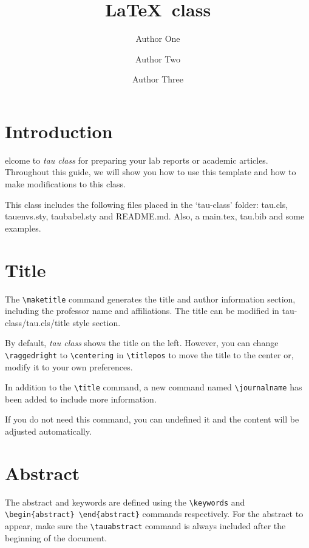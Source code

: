 \documentclass[9pt,a4paper,twoside]{tau-class/tau}
\title{\LaTeX\ class}
\author[a,1]{Author One}
\author[b,2]{Author Two}
\author[b,c,3]{Author Three}
\affil[a]{Affiliation of author one}
\affil[b]{Affiliation of author two}
\affil[c]{Affiliation of author three}
\begin{document}
		
    \maketitle 
    \thispagestyle{firststyle} \tauabstract 
    \tableofcontents
    \linenumbers 
    

\section{Introduction}

    elcome to \textit{tau class} for preparing your lab reports or academic articles. Throughout this guide, we will show you how to use this template and how to make modifications to this class. 
	
    This class includes the following files placed in the ‘tau-class’ folder: tau.cls, tauenvs.sty, taubabel.sty and README.md. Also, a main.tex, tau.bib and some examples. 

\section{Title}

    The \verb*|\maketitle| command generates the title and author information section, including the professor name and affiliations. The title can be modified in tau-class/tau.cls/title style section. 
	
    By default, \textit{tau class} shows the title on the left. However, you can change \verb*|\raggedright| to \verb*|\centering| in \verb*|\titlepos| to move the title to the center or, modify it to your own preferences.
	
    In addition to the \verb|\title| command, a new command named \verb|\journalname| has been added to include more information. 
	
    If you do not need this command, you can undefined it and the content will be adjusted automatically.
	
\section{Abstract}

    The abstract and keywords are defined using the \verb*|\keywords| and \verb*|\begin{abstract} \end{abstract}| commands respectively. For the abstract to appear, make sure the \verb|\tauabstract| command is always included after the beginning of the document.
    
\end{document}
